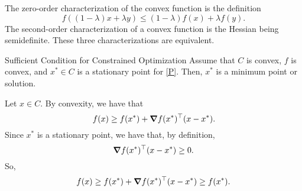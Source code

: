 \begin{rmk}
	The zero-order characterization of the convex function is the definition \[f((1-\lambda)x+\lambda y)\leq(1-\lambda)f(x)+\lambda f(y).\]	The second-order characterization of a convex function is the Hessian being semidefinite. These three characterizations are equivalent. 
\end{rmk}
\begin{thm}{Sufficient Condition for Constrained Optimization}
	Assume that $C$ is convex, $f$ is convex, and $x^*\in C$ is a stationary point for \eqref{P}. Then, $x^*$ is a minimum point or solution. 	
\end{thm}
\begin{prf}
	Let $x\in C$. By convexity, we have that \[f(x)\geq f(x^*)+\grad f(x^*)^\top(x-x^*).\] Since $x^*$ is a stationary point, we have that, by definition, \[\grad f(x^*)^\top(x-x^*)\geq0.\] So, \[f(x)\geq f(x^*)+\grad f(x^*)^\top(x-x^*)\geq f(x^*).\]
\end{prf}
